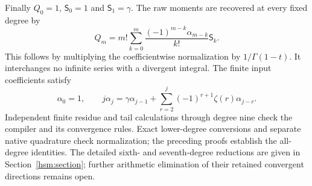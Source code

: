 Finally $Q_0=1$, $\mathsf S_0=1$ and $\mathsf S_1=\gamma$.
The raw moments are recovered at every fixed degree by
\begin{equation}\label{gat:inverse}
 Q_m=m!\sum_{k=0}^m\frac{(-1)^{m-k}\alpha_{m-k}}{k!}\mathsf S_k.
\end{equation}
This follows by multiplying the coefficientwise normalization by
$1/\Gamma(1-t)$.  It interchanges no infinite series with a divergent
integral.  The finite input coefficients satisfy
\[
 \alpha_0=1,\qquad
 j\alpha_j=\gamma\alpha_{j-1}
          +\sum_{r=2}^j(-1)^{r+1}\zeta(r)\alpha_{j-r}.
\]
Independent finite residue and tail calculations through degree nine
check the compiler and its convergence rules.  Exact lower-degree
conversions and separate native quadrature check normalization; the
preceding proofs establish the all-degree identities.  The detailed sixth- and seventh-degree reductions are given in
Section~\ref{hsm:section}; further arithmetic elimination of their
retained convergent directions remains open.
